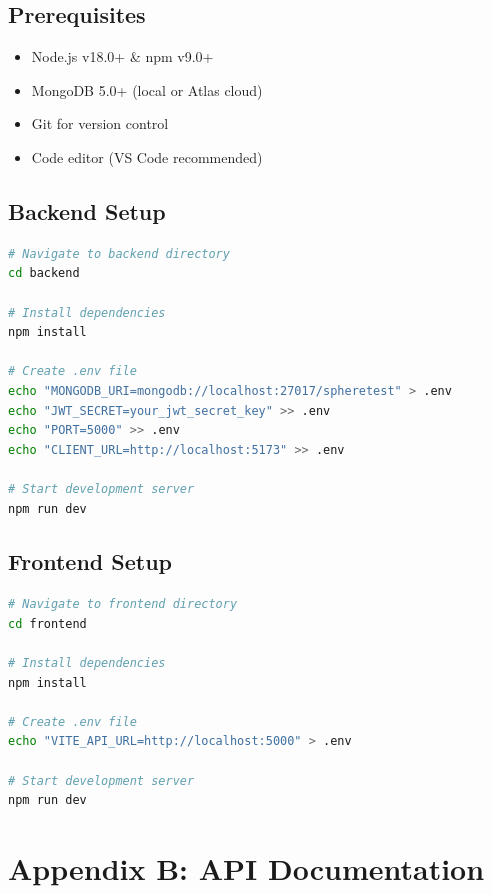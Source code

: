 \documentclass[12pt,a4paper]{report}
\newenvironment{reqbox}{%
  \begin{tcolorbox}[colback=lightgray,colframe=rulecol,
    leftrule=3pt,rightrule=0.4pt,toprule=0.4pt,bottomrule=0.4pt,
    arc=2pt,boxsep=2pt,left=4pt,right=4pt,top=3pt,bottom=3pt,breakable]
}{\end{tcolorbox}}
\begin{document}
\section{Prerequisites}

\begin{reqbox}
  \begin{itemize}[left=0pt]
    \item Node.js v18.0+ \& npm v9.0+
    \item MongoDB 5.0+ (local or Atlas cloud)
    \item Git for version control
    \item Code editor (VS Code recommended)
  \end{itemize}
\end{reqbox}

\section{Backend Setup}

\begin{lstlisting}[language=bash]
# Navigate to backend directory
cd backend

# Install dependencies
npm install

# Create .env file
echo "MONGODB_URI=mongodb://localhost:27017/spheretest" > .env
echo "JWT_SECRET=your_jwt_secret_key" >> .env
echo "PORT=5000" >> .env
echo "CLIENT_URL=http://localhost:5173" >> .env

# Start development server
npm run dev
\end{lstlisting}

\section{Frontend Setup}

\begin{lstlisting}[language=bash]
# Navigate to frontend directory
cd frontend

# Install dependencies
npm install

# Create .env file
echo "VITE_API_URL=http://localhost:5000" > .env

# Start development server
npm run dev
\end{lstlisting}

\chapter{Appendix B: API Documentation}
\end{document}
